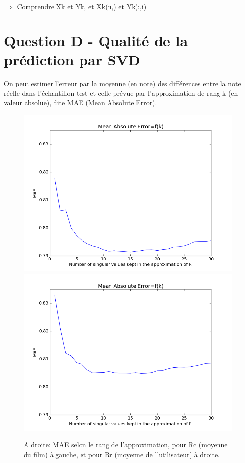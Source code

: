 \documentclass[12pt,a4paper]{article}
\begin{document}
$\Rightarrow$ Comprendre Xk et Yk, et Xk(u,) et Yk(:,i)

\newpage
\section{Question D - Qualité de la prédiction par SVD}
On peut estimer l'erreur par la moyenne (en note) des différences entre la note réelle dans l'échantillon test et celle prévue par l'approximation de rang k (en valeur absolue), dite MAE (Mean Absolute Error).\\

\begin{figure}[h!]
	\includegraphics[scale=0.38]{MAE-By-Movie.png}
	\includegraphics[scale=0.38]{MAE-By-User.png}
	\caption{A droite: MAE selon le rang de l'approximation, pour Rc (moyenne du film) à gauche, et pour Rr (moyenne de l'utilisateur) à droite.}
\end{figure}
\end{document}
